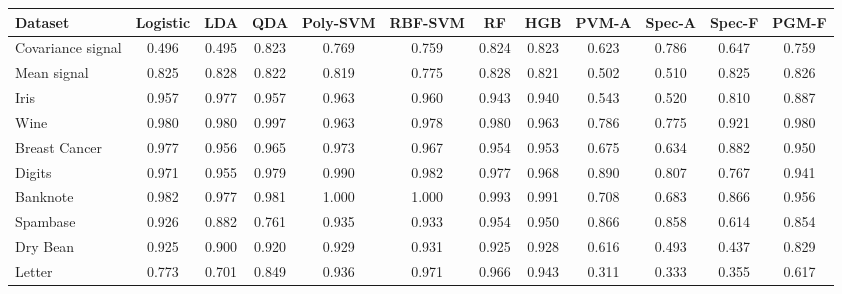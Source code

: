 \begin{tabular}{lccccccccccc}
\toprule
Dataset & Logistic & LDA & QDA & Poly-SVM & RBF-SVM & RF & HGB & PVM-A & Spec-A & Spec-F & PGM-F \\
\midrule
Covariance signal & 0.496 & 0.495 & 0.823 & 0.769 & 0.759 & 0.824 & 0.823 & 0.623 & 0.786 & 0.647 & 0.759 \\
Mean signal & 0.825 & 0.828 & 0.822 & 0.819 & 0.775 & 0.828 & 0.821 & 0.502 & 0.510 & 0.825 & 0.826 \\
Iris & 0.957 & 0.977 & 0.957 & 0.963 & 0.960 & 0.943 & 0.940 & 0.543 & 0.520 & 0.810 & 0.887 \\
Wine & 0.980 & 0.980 & 0.997 & 0.963 & 0.978 & 0.980 & 0.963 & 0.786 & 0.775 & 0.921 & 0.980 \\
Breast Cancer & 0.977 & 0.956 & 0.965 & 0.973 & 0.967 & 0.954 & 0.953 & 0.675 & 0.634 & 0.882 & 0.950 \\
Digits & 0.971 & 0.955 & 0.979 & 0.990 & 0.982 & 0.977 & 0.968 & 0.890 & 0.807 & 0.767 & 0.941 \\
Banknote & 0.982 & 0.977 & 0.981 & 1.000 & 1.000 & 0.993 & 0.991 & 0.708 & 0.683 & 0.866 & 0.956 \\
Spambase & 0.926 & 0.882 & 0.761 & 0.935 & 0.933 & 0.954 & 0.950 & 0.866 & 0.858 & 0.614 & 0.854 \\
Dry Bean & 0.925 & 0.900 & 0.920 & 0.929 & 0.931 & 0.925 & 0.928 & 0.616 & 0.493 & 0.437 & 0.829 \\
Letter & 0.773 & 0.701 & 0.849 & 0.936 & 0.971 & 0.966 & 0.943 & 0.311 & 0.333 & 0.355 & 0.617 \\
\bottomrule
\end{tabular}
